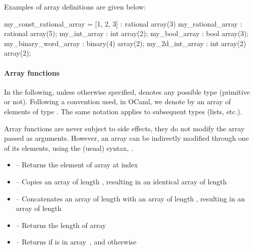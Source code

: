 Examples of array definitions are given below:

\begin{IMITATORmodel}
	my_const_rational_array = [1, 2, 3] : rational array(3)
	my_rational_array    	: rational array(5);
	my_int_array         	: int array(2);
	my_bool_array        	: bool array(3);
	my_binary_word_array 	: binary(4) array(2);
	my_2d_int_array      	: int array(2) array(2);
\end{IMITATORmodel}




\paragraph{Array functions}

In the following, unless otherwise specified,  denotes any possible type (primitive or not).
Following a convention used, \eg{} in OCaml, we denote by  an array of elements of type .
The same notation applies to subsequent types (lists, etc.).

Array functions are never subject to side effects, \ie{} they do not modify the array passed as arguments.
However, an array can be indirectly modified through one of its elements, using the (usual) syntax, \eg{} .

\begin{itemize}
	\item {} -- Returns the element of array  at index 

	\item \label{item:lbl-array_copy}  -- Copies an array of length , resulting in an identical array of length 

	\item \label{item:lbl-array_append}  -- Concatenates an array of length  with an array of length , resulting in an array of length 

	\item \label{item:lbl-array_length}  -- Returns the length of array~

	\item \label{item:lbl-array_mem}  -- Returns  if  is in array~, and  otherwise
\end{itemize}

